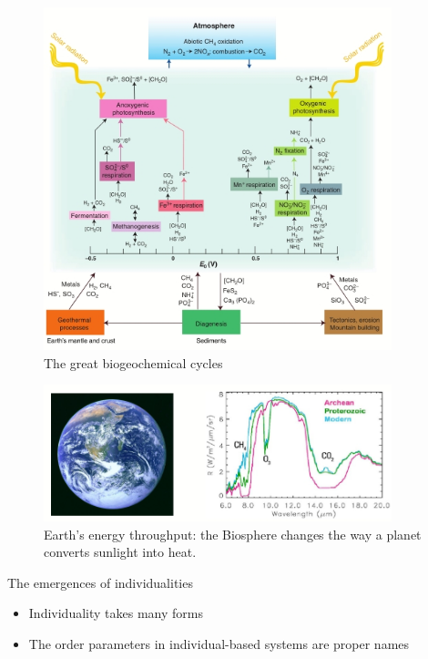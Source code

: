 \documentclass[]{article}
\begin{document}
\begin{appendices}
\begin{figure}[H]
	\caption[The great biogeochemical cycles]{The great biogeochemical cycles\cite{falkowski2008microbial}}\label{fig:biogeochemical} 
	\includegraphics[width=0.9\textwidth]{biogeochemical}
\end{figure}



\begin{figure}[H]
	\caption[Earth’s energy throughput]{Earth’s energy throughput: the Biosphere changes the way a planet converts sunlight into heat.\cite{meadows2005modelling}}\label{fig:EnergyThroughput} 
	\includegraphics[width=0.9\textwidth]{EnergyThroughput}
\end{figure}

The emergences of individualities
\begin{itemize}
	\item Individuality takes many 	forms
	\item The order parameters in individual-based systems 	are proper names
\end{itemize}


\end{appendices}
\end{document}
